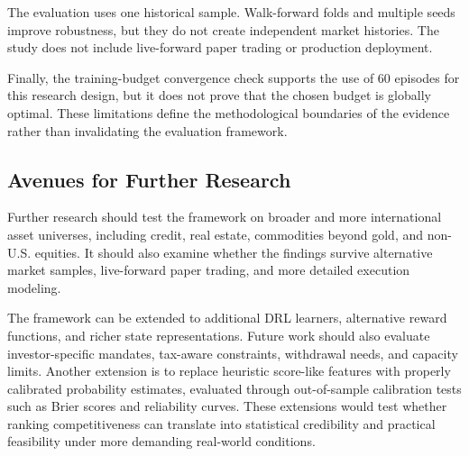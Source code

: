 \documentclass[12pt]{article}
\begin{document}
The evaluation uses one historical sample. Walk-forward folds and multiple seeds improve robustness, but they do not create independent market histories. The study does not include live-forward paper trading or production deployment.

Finally, the training-budget convergence check supports the use of 60 episodes for this research design, but it does not prove that the chosen budget is globally optimal. These limitations define the methodological boundaries of the evidence rather than invalidating the evaluation framework.

\subsection{Avenues for Further Research}

Further research should test the framework on broader and more international asset universes, including credit, real estate, commodities beyond gold, and non-U.S. equities. It should also examine whether the findings survive alternative market samples, live-forward paper trading, and more detailed execution modeling.

The framework can be extended to additional DRL learners, alternative reward functions, and richer state representations. Future work should also evaluate investor-specific mandates, tax-aware constraints, withdrawal needs, and capacity limits. Another extension is to replace heuristic score-like features with properly calibrated probability estimates, evaluated through out-of-sample calibration tests such as Brier scores and reliability curves. These extensions would test whether ranking competitiveness can translate into statistical credibility and practical feasibility under more demanding real-world conditions.
\end{document}

